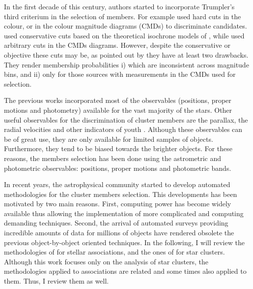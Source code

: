 In the first decade of this century, authors started to incorporate Trumpler's third criterium in the selection of members. For example \citet{2003A&A...400..891M, 2004A&A...416..125D,2007A&A...470..585B,Lodieu2012} used hard cuts in the colour, or in the colour magnitude diagrams (CMDs) to discriminate candidates. \citet{2003A&A...400..891M} used conservative cuts based on the theoretical isochrone models of \citet{1998A&A...337..403B}, while \citet{2004A&A...416..125D,2007A&A...470..585B,Lodieu2012} used arbitrary cuts in the CMDs diagrams. However, despite the conservative or objective these cuts may be, as pointed out by \citet{Sarro2014} they have at least two drawbacks. They render membership probabilities i) which are inconsistent across magnitude bins, and ii) only for those sources with measurements in the CMDs used for selection.
  
The previous works incorporated most of the observables (positions, proper motions and photometry) available for the vast majority of the stars. Other useful observables for the discrimination of cluster members are the parallax, the radial velocities and other indicators of youth \cite[e.g. lithium abundance, photospheric activity, rotation, see for example][]{2016A&A...596A.113B}.  Although these observables can be of great use, they are only available for limited samples of objects. Furthermore, they tend to be biased towards the brighter objects. For these reasons, the members selection has been done using the astrometric and photometric observables: positions, proper motions and photometric bands.

In recent years, the astrophysical community started to develop automated methodologies for the cluster members selection. This developments has been motivated by two main reasons. First, computing power has become widely available thus allowing the implementation of more complicated and computing demanding techniques. Second, the arrival of automated surveys providing incredible amounts of data for millions of objects have rendered obsolete the previous object-by-object oriented techniques. In the following, I will review the methodologies of \citet{Malo2013,Gagne2014,Riedel2017} for stellar associations, and the ones of \citet{KroneMartins2014,Sarro2014,Sampedro2016} for star clusters. Although this work focuses only on the analysis of star clusters, the methodologies applied to associations are related and some times also applied to them. Thus, I review them as well.

